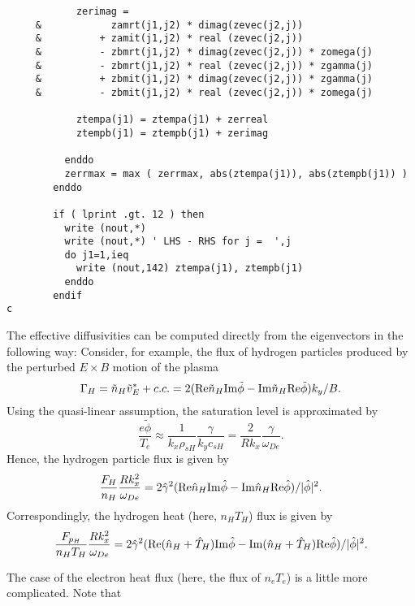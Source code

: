 \begin{verbatim}
            zerimag =
     &            zamrt(j1,j2) * dimag(zevec(j2,j))
     &          + zamit(j1,j2) * real (zevec(j2,j))
     &          - zbmrt(j1,j2) * dimag(zevec(j2,j)) * zomega(j)
     &          - zbmrt(j1,j2) * real (zevec(j2,j)) * zgamma(j)
     &          + zbmit(j1,j2) * dimag(zevec(j2,j)) * zgamma(j)
     &          - zbmit(j1,j2) * real (zevec(j2,j)) * zomega(j)

            ztempa(j1) = ztempa(j1) + zerreal
            ztempb(j1) = ztempb(j1) + zerimag

          enddo
          zerrmax = max ( zerrmax, abs(ztempa(j1)), abs(ztempb(j1)) )
        enddo

        if ( lprint .gt. 12 ) then
          write (nout,*)
          write (nout,*) ' LHS - RHS for j =  ',j
          do j1=1,ieq
            write (nout,142) ztempa(j1), ztempb(j1)
          enddo
        endif
c
\end{verbatim}

The effective diffusivities can be computed directly from the 
eigenvectors in the following way:
Consider, for example, the flux of hydrogen particles produced by
the perturbed $ E \times B $ motion of the plasma
\[ \Gamma_H = \tilde{n}_H \tilde{v}_E^* + c.c. 
 = 2 ( {\rm Re} \tilde{n}_H {\rm Im} \tilde{\phi}
     - {\rm Im} \tilde{n}_H {\rm Re} \tilde{\phi} ) k_y / B. \]
Using the quasi-linear assumption, the saturation level is 
approximated by
\[ \frac{e \tilde{\phi}}{T_e}
 \approx \frac{1}{k_x \rho_{sH}} \frac{ \gamma }{ k_y c_{sH} }
 = \frac{2}{R k_x} \frac{\gamma}{\omega_{De}}. \]
Hence, the hydrogen particle flux is given by
\[ \frac{ F_H }{ n_H } \frac{ R k_x^2 }{ \omega_{De} }
  = 2 \hat{\gamma}^2
  ( {\rm Re} \hat{n}_H {\rm Im} \hat{\phi}
  - {\rm Im} \hat{n}_H {\rm Re} \hat{\phi} ) / | \hat{\phi} |^2.
   \]
Correspondingly, the hydrogen heat (here, $ n_H T_H $) flux is given by
\[ \frac{ F_{p_H} }{ n_H T_H } \frac{ R k_x^2 }{ \omega_{De} }
  = 2 \hat{\gamma}^2
  ( {\rm Re} ( \hat{n}_H + \hat{T}_H ) {\rm Im} \hat{\phi}
  - {\rm Im} ( \hat{n}_H + \hat{T}_H ) {\rm Re} \hat{\phi} )
    / | \hat{\phi} |^2.
   \]

The case of the electron heat flux (here, the flux of $ n_e T_e $)
is a little more complicated.  Note that

